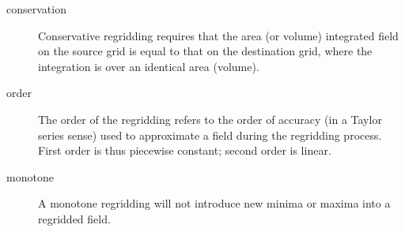 %

%
% 
%
%
%

\begin{description}

\item [conservation] \label{glos:conservation}
      Conservative regridding requires that the area (or volume)
      integrated field on the source grid is equal to that on
      the destination grid, where the integration is over an
      identical area (volume).

\item [order] \label{glos:order}
      The order of the regridding refers to the order of accuracy
      (in a Taylor series sense) used to approximate a field during
      the regridding process.  First order is thus piecewise constant;
      second order is linear.

\item [monotone] \label{glos:monotone}
      A monotone regridding will not introduce new minima or
      maxima into a regridded field.

\end{description}








